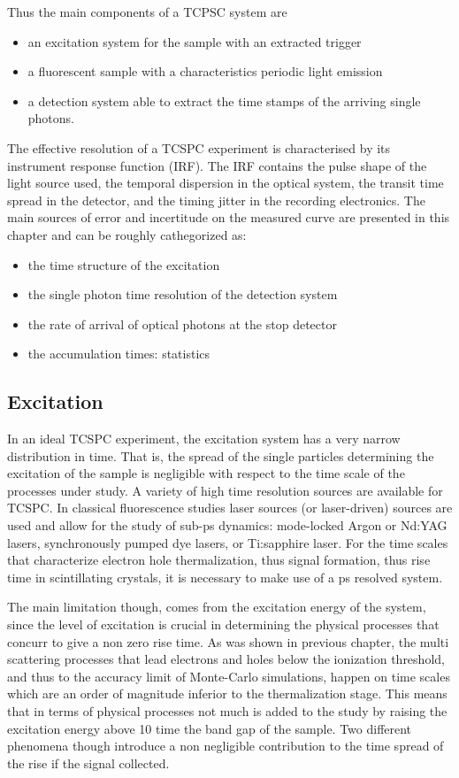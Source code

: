 Thus the main components of a TCPSC system are
\begin{itemize}
\item an excitation system for the sample with an extracted trigger
\item a fluorescent sample with a characteristics periodic light emission
\item a detection system able to extract the time stamps of the arriving single photons.
\end{itemize}
The effective resolution of a TCSPC experiment is characterised by its instrument response function (IRF). The IRF contains the pulse shape of the light source used, the temporal dispersion in the optical system, the transit time spread in the detector, and the timing jitter in the recording electronics.
The main sources of error and incertitude on the measured curve are presented in this chapter and can be roughly cathegorized as:
\begin{itemize}
\item the time structure of the excitation
\item the single photon time resolution of the detection system
\item the rate of arrival of optical photons at the stop detector
\item the accumulation times: statistics
\end{itemize}

\subsection{Excitation}
In an ideal TCSPC experiment, the excitation system has a very narrow distribution in time. That is, the spread of the single particles determining the excitation of the sample is negligible with respect to the time scale of the processes under study.
A variety of high time resolution sources are available for TCSPC. In classical fluorescence studies laser sources (or laser-driven) sources are used and allow for the study of sub-ps dynamics: mode-locked Argon or Nd:YAG lasers, synchronously pumped dye lasers, or Ti:sapphire laser.
For the time scales that characterize electron hole thermalization, thus signal formation, thus rise time in scintillating crystals, it is necessary to make use of a ps resolved system.

The main limitation though, comes from the excitation energy of the system, since the level of excitation is crucial in determining the physical processes that concurr to give a non zero rise time. 
As was shown in previous chapter, the multi scattering processes that lead electrons and holes below the ionization threshold, and thus to the accuracy limit of Monte-Carlo simulations, happen on time scales which are an order of magnitude inferior to the thermalization stage. 
This means that in terms of physical processes not much is added to the study by raising the excitation energy above 10 time %
the band gap of the sample.
Two different phenomena though introduce a non negligible contribution to the time spread of the rise if the signal collected.

